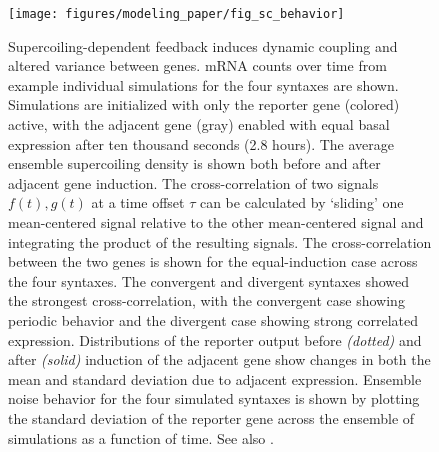 \documentclass[11pt]{article} %
\begin{document}
\begin{figure}[htbp]
    \centering
    {\texttt{[image: figures/modeling\_paper/fig\_sc\_behavior]}
    \label{fig:sc_examples}
    \label{fig:sc_density}
    \label{fig:cross_correlation_cartoon}
    \label{fig:orientation_cross_correlation}
    \label{fig:output_distribution_by_orientation_dynamics}
    \label{fig:noise_by_orientation}
    }
\end{figure}
\begin{figure}[htbp]
    \ContinuedFloat
    \caption{Supercoiling-dependent feedback induces dynamic coupling and altered variance between genes.
         mRNA counts over time from example individual simulations for the four syntaxes are shown. Simulations are initialized with only the reporter gene (colored) active, with the adjacent gene (gray) enabled with equal basal expression after ten thousand seconds (2.8 hours).
         The average ensemble supercoiling density is shown both before and after adjacent gene induction.
         The cross-correlation of two signals \(f(t), g(t)\) at a time offset \(\tau\) can be calculated by `sliding' one mean-centered signal relative to the other mean-centered signal and integrating the product of the resulting signals.
         The cross-correlation between the two genes is shown for the equal-induction case across the four syntaxes. The convergent and divergent syntaxes showed the strongest cross-correlation, with the convergent case showing periodic behavior and the divergent case showing strong correlated expression.
         Distributions of the reporter output before \textit{(dotted)} and after \textit{(solid)} induction of the adjacent gene show changes in both the mean and standard deviation due to adjacent expression.
         Ensemble noise behavior for the four simulated syntaxes is shown by plotting the standard deviation of the reporter gene across the ensemble of simulations as a function of time.
        See also .
    }
    \label{fig:top:single_cell_behavior}
\end{figure}
\end{document}
